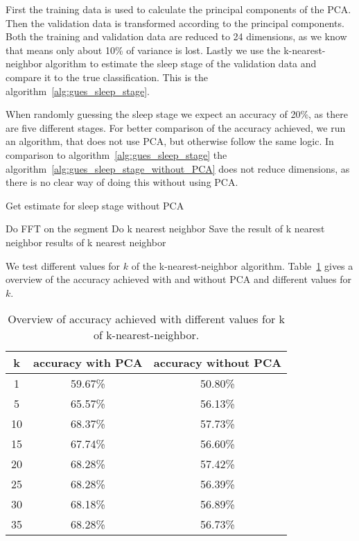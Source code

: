 First the training data is used to calculate the principal components of the PCA. Then the validation data is transformed according to the principal components. Both the training and validation data are reduced to 24 dimensions, as we know that means only about 10\% of variance is lost. Lastly we use the k-nearest-neighbor algorithm to estimate the sleep stage of the validation data and compare it to the true classification. This is the algorithm~\ref{alg:gues_sleep_stage}.

When randomly guessing the sleep stage we expect an accuracy of 20\%, as there are five different stages. For better comparison of the accuracy achieved, we run an algorithm, that does not use PCA, but otherwise follow the same logic. In comparison to algorithm~\ref{alg:gues_sleep_stage} the algorithm~\ref{alg:gues_sleep_stage_without_PCA} does not reduce dimensions, as there is no clear way of doing this without using PCA.

\begin{algorithm}
	\caption{Get estimate for sleep stage without PCA}\label{alg:gues_sleep_stage_without_PCA}
	\begin{algorithmic}
		\State Do FFT on the segment
		\State Do k nearest neighbor
		\State Save the result of k nearest neighbor
		\EndFor
		\State \Return results of k nearest neighbor
	\end{algorithmic}
\end{algorithm}

We test different values for $k$ of the k-nearest-neighbor algorithm. Table~\ref{tab:error_validation_overview} gives a overview of the accuracy achieved with and without PCA and different values for $k$.

\begin{table}
	\centering
	\begin{tabular}{c|c|c}
		k & accuracy with PCA & accuracy without PCA \\
		\hline
		1  & 59.67\% & 50.80\% \\
		5  & 65.57\% & 56.13\% \\
		10 & 68.37\% & 57.73\% \\
		15 & 67.74\% & 56.60\% \\
		20 & 68.28\% & 57.42\% \\
		25 & 68.28\% & 56.39\% \\
		30 & 68.18\% & 56.89\% \\
		35 & 68.28\% & 56.73\% \\
	\end{tabular}
	\caption{Overview of accuracy achieved with different values for k of k-nearest-neighbor.}
	\label{tab:error_validation_overview}
\end{table}

